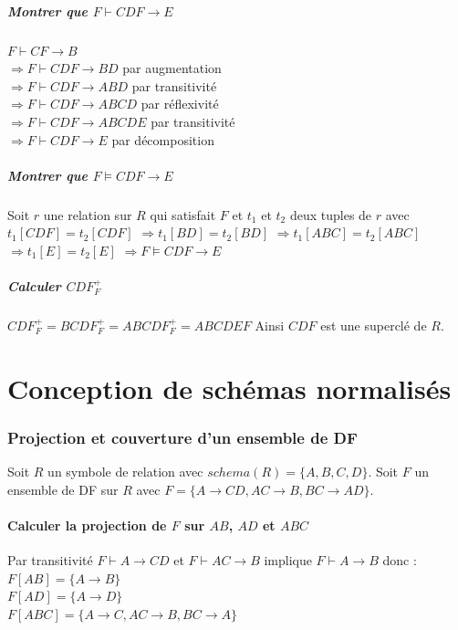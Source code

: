 \documentclass[10pt,a4paper,twoside]{article}
\begin{document}
\subsubsection{Montrer que $F\vdash CDF \rightarrow E$}
$F \vdash CF \rightarrow B$\\
$\Rightarrow F \vdash CDF \rightarrow BD$ par augmentation\\
$\Rightarrow F \vdash CDF \rightarrow ABD$ par transitivité\\
$\Rightarrow F \vdash CDF \rightarrow ABCD$ par réflexivité\\
$\Rightarrow F \vdash CDF \rightarrow ABCDE$ par transitivité\\
$\Rightarrow F \vdash CDF \rightarrow E$ par décomposition

\subsubsection{Montrer que $F\models CDF \rightarrow E$}
Soit $r$ une relation sur $R$ qui satisfait $F$ et $t_{1}$ et $t_{2}$ deux tuples de $r$ avec $t_{1}[CDF] = t_{2}[CDF]$
$\Rightarrow t_{1}[BD]=t_{2}[BD]$
$\Rightarrow t_{1}[ABC]=t_{2}[ABC]$
$\Rightarrow t_{1}[E]=t_{2}[E]$
$\Rightarrow F\models CDF \rightarrow E$

\subsubsection{Calculer $CDF^{+}_{F}$}
$CDF^{+}_{F} = BCDF^{+}_{F} = ABCDF^{+}_{F} = ABCDEF$ Ainsi $CDF$ est une superclé de $R$.

\newpage
\part{Conception de schémas normalisés}
\section{Projection et couverture d'un ensemble de DF}
Soit $R$ un symbole de relation avec $schema(R)=\{A,B,C,D\}$. Soit $F$ un ensemble de DF sur $R$ avec $F=\{A\rightarrow CD, AC \rightarrow B, BC \rightarrow AD\}$.

\subsection{Calculer la projection de $F$ sur $AB$, $AD$ et $ABC$}
\begin{flushleft}
Par transitivité $F \vdash A \rightarrow CD$ et $F\vdash AC \rightarrow B$ implique $F \vdash A\rightarrow B$ donc :\\
$F[AB] = \{A \rightarrow B\}$\\
$F[AD] = \{A \rightarrow D\}$\\
$F[ABC] = \{A \rightarrow C, AC \rightarrow B, BC \rightarrow A\}$
\end{flushleft}
\end{document}
